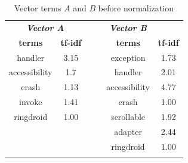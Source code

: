\begin{table}[htb]
\centering
\caption{Vector terms $A$ and $B$ before normalization}
\label{tbl: beforenormal}
\begin{tabular}{ccllcc}
\cline{1-2} \cline{5-6}
\multicolumn{2}{|c|}{{\color[HTML]{000000} \textit{\textbf{Vector A}}}}     &  & \multicolumn{1}{l|}{} & \multicolumn{1}{c|}{{\color[HTML]{000000} \textit{\textbf{Vector B}}}} & \multicolumn{1}{c|}{}                \\ \cline{1-2} \cline{5-6} 
\multicolumn{1}{|c|}{\textbf{terms}} & \multicolumn{1}{c|}{\textbf{tf-idf}} &  & \multicolumn{1}{l|}{} & \multicolumn{1}{c|}{\textbf{terms}}                                    & \multicolumn{1}{c|}{\textbf{tf-idf}} \\ \cline{1-2} \cline{5-6} 
\multicolumn{1}{|c|}{handler}        & \multicolumn{1}{c|}{3.15}            &  & \multicolumn{1}{l|}{} & \multicolumn{1}{c|}{exception}                                         & \multicolumn{1}{c|}{1.73}            \\ \cline{1-2} \cline{5-6} 
\multicolumn{1}{|c|}{accessibility}  & \multicolumn{1}{c|}{1.7}             &  & \multicolumn{1}{l|}{} & \multicolumn{1}{c|}{handler}                                           & \multicolumn{1}{c|}{2.01}            \\ \cline{1-2} \cline{5-6} 
\multicolumn{1}{|c|}{crash}          & \multicolumn{1}{c|}{1.13}            &  & \multicolumn{1}{l|}{} & \multicolumn{1}{c|}{accessibility}                                     & \multicolumn{1}{c|}{4.77}            \\ \cline{1-2} \cline{5-6} 
\multicolumn{1}{|c|}{invoke}         & \multicolumn{1}{c|}{1.41}            &  & \multicolumn{1}{l|}{} & \multicolumn{1}{c|}{crash}                                             & \multicolumn{1}{c|}{1.00}            \\ \cline{1-2} \cline{5-6} 
\multicolumn{1}{|c|}{ringdroid}      & \multicolumn{1}{c|}{1.00}            &  & \multicolumn{1}{l|}{} & \multicolumn{1}{c|}{scrollable}                                        & \multicolumn{1}{c|}{1.92}            \\ \cline{1-2} \cline{5-6} 
                                     & \textbf{}                            &  & \multicolumn{1}{l|}{} & \multicolumn{1}{c|}{adapter}                                           & \multicolumn{1}{c|}{2.44}            \\ \cline{5-6} 
                                     &                                      &  & \multicolumn{1}{l|}{} & \multicolumn{1}{c|}{ringdroid}                                         & \multicolumn{1}{c|}{1.00}   \\ \cline{5-6} 
                                     &                                      &  &                       &                                                                        &                                     
\end{tabular}
\end{table}

